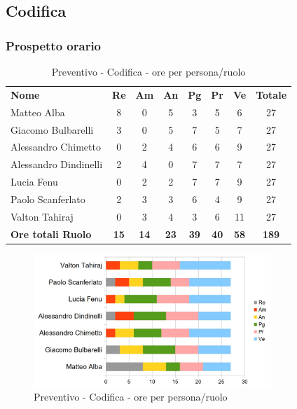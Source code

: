 \newpage

\subsection{Codifica }

	\subsubsection{Prospetto orario}

		\begin{table} [h!]
			\begin{center}
				\begin{tabular} { m{3.5cm} c c c c c c c }
					\rowcolor{lightgray}
					\textbf{Nome} & \textbf{Re} & \textbf{Am} & \textbf{An} & \textbf{Pg} & \textbf{Pr} & \textbf{Ve} & \textbf{Totale} \\
					Matteo Alba & 8 &0 & 5 & 3 & 5 & 6 & 27 \\
					Giacomo Bulbarelli & 3 & 0& 5 & 7 & 5 & 7 & 27 \\
					Alessandro Chimetto & 0& 2 & 4 & 6 & 6 & 9 & 27 \\
					Alessandro Dindinelli & 2 & 4 & 0& 7 & 7 & 7 & 27 \\
					Lucia Fenu &0 & 2 & 2 & 7 & 7 & 9 & 27 \\
					Paolo Scanferlato & 2 & 3 & 3 & 6 & 4 & 9 & 27 \\
					Valton Tahiraj &0 & 3 & 4 & 3 & 6 & 11 & 27 \\
					\textbf{Ore totali Ruolo} & \textbf{15} & \textbf{14} & \textbf{23} & \textbf{39} & \textbf{40}& \textbf{58} & \textbf{189}
				\end{tabular}
				\caption{Preventivo - Codifica  - ore per persona/ruolo}
			\end{center}
		\end{table}
		
		\begin{figure} [h!]
			\centering
			\includegraphics[width=0.8\textwidth]{res/img/grafici/CodificaTechnologyBaselineOre.jpg}
			\caption{Preventivo - Codifica  - ore per persona/ruolo} 
		\end{figure}
		
